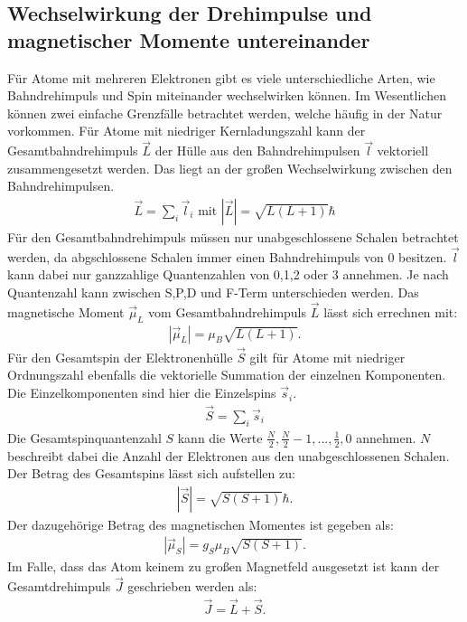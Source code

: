 \subsection{Wechselwirkung der Drehimpulse und magnetischer Momente untereinander}
Für Atome mit mehreren Elektronen gibt es viele unterschiedliche Arten, wie Bahndrehimpuls und Spin miteinander wechselwirken können.
Im Wesentlichen können zwei einfache Grenzfälle betrachtet werden, welche häufig in der Natur vorkommen.
%
Für Atome mit niedriger Kernladungszahl kann der Gesamtbahndrehimpuls $\vec{L}$ der Hülle aus den Bahndrehimpulsen $\vec{l}$ vektoriell zusammengesetzt werden.
Das liegt an der großen Wechselwirkung zwischen den Bahndrehimpulsen.
\begin{align*}
  \vec{L} = \sum_i{\vec{l}_i} \text{ mit } |\vec{L}|= \sqrt{L(L+1)}\hbar
\end{align*}
Für den Gesamtbahndrehimpuls müssen nur unabgeschlossene Schalen betrachtet werden, da abgschlossene Schalen immer einen Bahndrehimpuls von 0 besitzen.
$\vec{l}$ kann dabei nur ganzzahlige Quantenzahlen von 0,1,2 oder 3 annehmen.
Je nach Quantenzahl kann zwischen S,P,D und F-Term unterschieden werden.
Das magnetische Moment $\vec{\mu}_L$ vom Gesamtbahndrehimpuls $\vec{L}$ lässt sich errechnen mit:
\begin{align*}
  |\vec{\mu}_L| = \mu_B\sqrt{L(L+1)}.
\end{align*}
%
Für den Gesamtspin der Elektronenhülle $\vec{S}$ gilt für Atome mit niedriger Ordnungszahl ebenfalls die vektorielle Summation der einzelnen Komponenten.
Die Einzelkomponenten sind hier die Einzelspins $\vec{s}_i$.
\begin{align*}
  \vec{S} = \sum_{i}{\vec{s}_i}
\end{align*}
Die Gesamtspinquantenzahl $S$ kann die Werte $\frac{N}{2}, \frac{N}{2}-1, ..., \frac{1}{2},0$ annehmen.
$N$ beschreibt dabei die Anzahl der Elektronen aus den unabgeschlossenen Schalen.
Der Betrag des Gesamtspins lässt sich aufstellen zu:
\begin{align*}
  |\vec{S}| = \sqrt{S(S+1)}\hbar.
\end{align*}
Der dazugehörige Betrag des magnetischen Momentes ist gegeben als:
\begin{align*}
  |\vec{\mu}_S| = g_S\mu_B\sqrt{S(S+1)}.
\end{align*}
Im Falle, dass das Atom keinem zu großen Magnetfeld ausgesetzt ist kann der Gesamtdrehimpuls $\vec{J}$ geschrieben werden als:
\begin{align*}
  \vec{J} = \vec{L}+ \vec{S}.
\end{align*}
